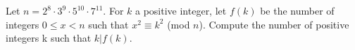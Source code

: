 Let $n = 2^8 \cdot 3^9  \cdot  5^{10} \cdot  7^{11}$.
For $k$ a positive integer, let $f(k)$ be the number of integers $0 \le x < n$ such that $x^2 \equiv k^2$ (mod $n$).
Compute the number of positive integers k such that $k | f(k)$.